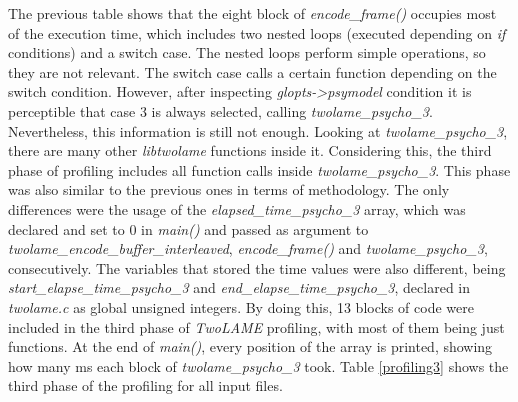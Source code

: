 The previous table shows that the eight block of \textit{encode\_frame()} occupies most of the execution time, which includes two nested loops (executed depending on \textit{if} conditions) and a switch case. The nested loops perform simple operations, so they are not relevant. The switch case calls a certain function depending on the switch condition. However, after inspecting \textit{glopts->psymodel} condition it is perceptible that case 3 is always selected, calling \textit{twolame\_psycho\_3}. Nevertheless, this information is still not enough. 
Looking at \textit{twolame\_psycho\_3}, there are many other \textit{libtwolame} functions inside it. Considering this, the third phase of profiling includes all function calls inside \textit{twolame\_psycho\_3}. 
This phase was also similar to the previous ones in terms of methodology. The only differences were the usage of the \textit{elapsed\_time\_psycho\_3} array, which was declared and set to 0 in \textit{main()} and passed as argument to \textit{twolame\_encode\_buffer\_interleaved}, \textit{encode\_frame()} and \textit{twolame\_psycho\_3}, consecutively. The variables that stored the time values were also different, being \textit{start\_elapse\_time\_psycho\_3} and \textit{end\_elapse\_time\_psycho\_3}, declared in \textit{twolame.c} as global unsigned integers.
By doing this, 13 blocks of code were included in the third phase of \textit{TwoLAME} profiling, with most of them being just functions.
At the end of \textit{main()}, every position of the array is printed, showing how many ms each block of \textit{twolame\_psycho\_3} took. 
Table \ref{profiling3} shows the third phase of the profiling for all input files.

